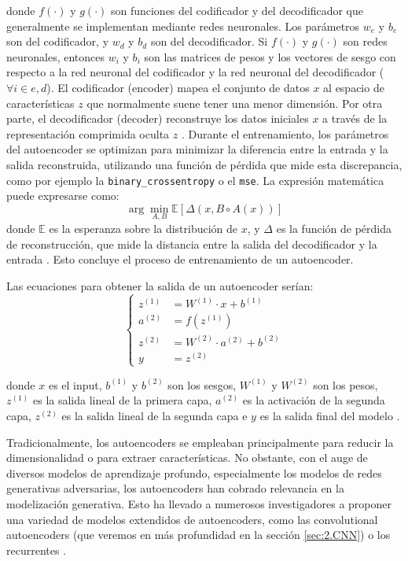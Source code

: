 donde $f(\cdot)$ y $g(\cdot)$ son funciones del codificador y del decodificador que generalmente se implementan mediante redes neuronales. Los parámetros $w_e$ y $b_e$ son del codificador, y $w_d$ y $b_d$ son del decodificador. Si $f(\cdot)$ y $g(\cdot)$ son redes neuronales, entonces $w_i$ y $b_i$ son las matrices de pesos y los vectores de sesgo con respecto a la red neuronal del codificador y la red neuronal del decodificador ($ \forall i \in  {e, d}$). El codificador (encoder) mapea el conjunto de datos $x$  al espacio de características $z$ que normalmente suene tener una menor dimensión. Por otra parte, el decodificador (decoder) reconstruye los datos iniciales $x$ a través de la representación comprimida oculta $z$ \citep{zhai2018autoencoder}. Durante el entrenamiento, los parámetros del autoencoder se optimizan para minimizar la diferencia entre la entrada y la salida reconstruida, utilizando una función de pérdida que mide esta discrepancia, como por ejemplo la \lstinline|binary_crossentropy| o el \lstinline|mse|. La expresión matemática puede expresarse como:
\begin{equation}
\arg \min_{A, B} \mathbb{E}[\Delta(x, B \circ A(x))]
\end{equation}
donde $\mathbb{E}$ es la esperanza sobre la distribución de $x$, y $\Delta$ es la función de pérdida de reconstrucción, que mide la distancia entre la salida del decodificador y la entrada \citep{bank2023autoencoders}. Esto concluye el proceso de entrenamiento de un autoencoder.


Las ecuaciones para obtener la salida de un autoencoder serían:
\[
\left\{
\begin{aligned}
z^{(1)} &= W^{(1)} \cdot x + b^{(1)} \\
a^{(2)} &= f(z^{(1)})  \\
z^{(2)} &= W^{(2)} \cdot a^{(2)} + b^{(2)}  \\
y &= z^{(2)} 
\end{aligned}
\right.
\]

donde  $x$ es el input, \( b^{(1)} \) y  \( b^{(2)} \) son los sesgos,  \( W^{(1)} \) y  \( W^{(2)} \) son los pesos, \( z^{(1)} \) es la salida lineal de la primera capa, \( a^{(2)} \) es la activación de la segunda capa, \( z^{(2)} \) es la salida lineal de la segunda capa e \( y \) es la salida final del modelo \citep{martinez2017analisis}.


Tradicionalmente, los autoencoders se empleaban principalmente para reducir la dimensionalidad o para extraer características. No obstante, con el auge de diversos modelos de aprendizaje profundo, especialmente los modelos de redes generativas adversarias, los autoencoders han cobrado relevancia en la modelización generativa. Esto ha llevado a numerosos investigadores a proponer una variedad de modelos extendidos de autoencoders, como las convolutional autoencoders (que veremos en más profundidad en la sección \ref{sec:2.CNN}) o los recurrentes \citep{zhai2018autoencoder}. 

